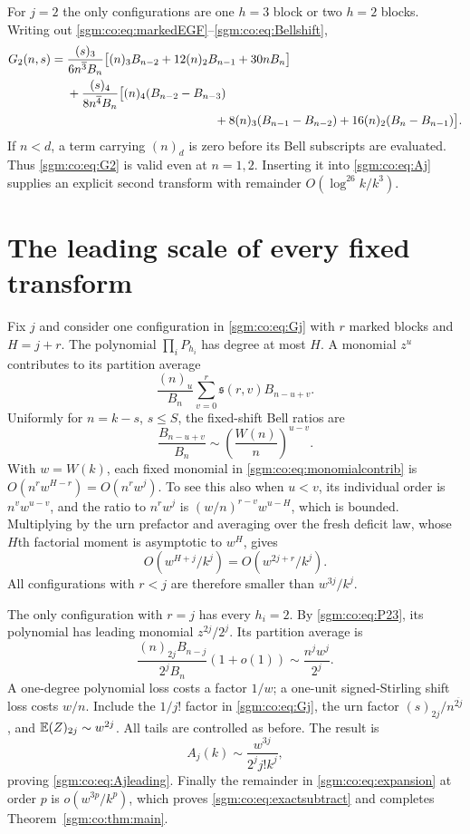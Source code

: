 \documentclass[11pt,letterpaper]{article}
\theoremstyle{remark}\newtheorem{remark}[theorem]{Remark}
\theoremstyle{definition}\newtheorem{definition}[theorem]{Definition}
\begin{document}
For $j=2$ the only configurations are one $h=3$ block or two $h=2$ blocks. Writing out \eqref{sgm:co:eq:markedEGF}--\eqref{sgm:co:eq:Bellshift},
\begin{align}\label{sgm:co:eq:G2}
 G_2(n,s)={}&\frac{(s)_3}{6n^{\overline3}B_n}
 \big[(n)_3B_{n-2}+12(n)_2B_{n-1}+30nB_n\big]\nonumber\\
 &+\frac{(s)_4}{8n^{\overline4}B_n}
 \big[(n)_4(B_{n-2}-B_{n-3})\nonumber\\
 &\hspace{43mm}+8(n)_3(B_{n-1}-B_{n-2})
       +16(n)_2(B_n-B_{n-1})\big].
\end{align}
If $n<d$, a term carrying $(n)_d$ is zero before its Bell subscripts are evaluated. Thus \eqref{sgm:co:eq:G2} is valid even at $n=1,2$. Inserting it into \eqref{sgm:co:eq:Aj} supplies an explicit second transform with remainder $O(\log^{26}k/k^3)$.

\section{The leading scale of every fixed transform}\label{sgm:co:sec:leading}
Fix $j$ and consider one configuration in \eqref{sgm:co:eq:Gj} with $r$ marked blocks and $H=j+r$. The polynomial $\prod_iP_{h_i}$ has degree at most $H$. A monomial $z^u$ contributes to its partition average
\begin{equation}\label{sgm:co:eq:monomialcontrib}
 \frac{(n)_u}{B_n}\sum_{v=0}^r\mathfrak{s}(r,v)B_{n-u+v}.
\end{equation}
Uniformly for $n=k-s$, $s\le S$, the fixed-shift Bell ratios are
\[
 \frac{B_{n-u+v}}{B_n}\sim\left(\frac{W(n)}n\right)^{u-v}.
\]
With $w=W(k)$, each fixed monomial in \eqref{sgm:co:eq:monomialcontrib} is $O(n^rw^{H-r})=O(n^rw^j)$. To see this also when $u<v$, its individual order is $n^vw^{u-v}$, and the ratio to $n^rw^j$ is $(w/n)^{r-v}w^{u-H}$, which is bounded. Multiplying by the urn prefactor and averaging over the fresh deficit law, whose $H$th factorial moment is asymptotic to $w^H$, gives
\begin{equation}\label{sgm:co:eq:configscale}
 O(w^{H+j}/k^j)=O(w^{2j+r}/k^j).
\end{equation}
All configurations with $r<j$ are therefore smaller than $w^{3j}/k^j$.

The only configuration with $r=j$ has every $h_i=2$. By \eqref{sgm:co:eq:P23}, its polynomial has leading monomial $z^{2j}/2^j$. Its partition average is
\[
 \frac{(n)_{2j}B_{n-j}}{2^jB_n}(1+o(1))
 \sim\frac{n^jw^j}{2^j}.
\]
A one-degree polynomial loss costs a factor $1/w$; a one-unit signed-Stirling shift loss costs $w/n$. Include the $1/j!$ factor in \eqref{sgm:co:eq:Gj}, the urn factor $(s)_{2j}/n^{\overline{2j}}$, and $\mathbb E(Z)_{2j}\sim w^{2j}$. All tails are controlled as before. The result is
\[
 A_j(k)\sim\frac{w^{3j}}{2^jj!k^j},
\]
proving \eqref{sgm:co:eq:Ajleading}. Finally the remainder in \eqref{sgm:co:eq:expansion} at order $p$ is $o(w^{3p}/k^p)$, which proves \eqref{sgm:co:eq:exactsubtract} and completes Theorem~\ref{sgm:co:thm:main}.
\end{document}
